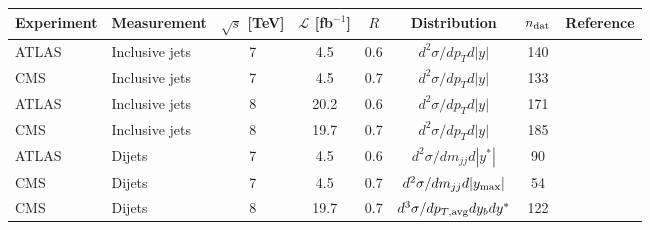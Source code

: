 \begin{tabularx}{\textwidth}{XXcccccc}
\toprule
  Experiment 
& Measurement   
& $\sqrt{s}$ [TeV]
& $\mathcal{L}$ [fb$^{-1}$] 
& $R$
& Distribution  
& $n_{\rm dat}$ 
& Reference   \\
\midrule
  ATLAS  
& Inclusive jets  
& 7 
& 4.5
& 0.6
& $d^2\sigma/dp_Td|y|$  
& 140  
& \cite{Aad:2014vwa}  \\
  CMS  
& Inclusive jets  
& 7
& 4.5
& 0.7
& $d^2\sigma/dp_Td|y|$  
& 133 
& \cite{Chatrchyan:2012bja}  \\
  ATLAS  
& Inclusive jets  
& 8
& 20.2
& 0.6
& $d^2\sigma/dp_Td|y|$  
& 171  
& \cite{Aaboud:2017dvo}  \\
  CMS  
& Inclusive jets  
& 8 
& 19.7
& 0.7
& $d^2\sigma/dp_Td|y|$  
& 185  
& \cite{Khachatryan:2016mlc}  \\
\midrule
  ATLAS  
& Dijets  
& 7 
& 4.5
& 0.6
& $d^2\sigma/dm_{jj}d|y^{*}|$  
& 90 
& \cite{Aad:2013tea}  \\
  CMS  
& Dijets  
& 7 
& 4.5
& 0.7
& $d^2\sigma/dm_{jj}d|y_{\rm max}|$  
& 54  
& \cite{Chatrchyan:2012bja}  \\
  CMS  
& Dijets  
& 8 
& 19.7
& 0.7
& $d^3\sigma/dp_{T,\rm avg}dy_b dy^{*}$  
& 122  
& \cite{Sirunyan:2017skj}  \\
\bottomrule
\end{tabularx}
